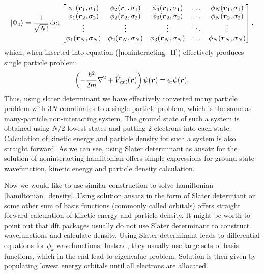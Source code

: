 \documentclass[openany, longbibliography,slovene,a4paper,12pt]{article}
\def\vec#1{\mbox{\boldmath$#1$}}
\begin{document}
 \[
       \ket{\Phi_0} = \frac{1}{\sqrt{N!}}\det 
   \begin{bmatrix}
   \phi_{1}(\vec r_1, \sigma_1) & \phi_{2}(\vec r_1, \sigma_1) & \phi_{3}(\vec
   r_1, \sigma_1) & \dots & \phi_{N}(\vec r_1, \sigma_1) \\
    \phi_{1}(\vec r_2, \sigma_2) & \phi_{2}(\vec r_2, \sigma_2) & \phi_{3}(\vec
    r_2, \sigma_2) & \dots & \phi_{N}(\vec r_2, \sigma_2) \\
    \vdots & \vdots & \vdots & \ddots & \vdots \\
     \phi_{1}(\vec r_N, \sigma_N) & \phi_{2}(\vec r_N, \sigma_N) & \phi_{3}(\vec r_N, \sigma_N) & \dots & \phi_{N}(\vec r_N, \sigma_N) \\
\end{bmatrix},
\]
 which, when inserted into equation (\ref{noninteracting_H}) effectively produces
 single particle problem:
 \begin{equation}
   \left(-\frac{\hbar^2}{2m}\nabla^2 + \hat V_{ext}(\vec r)\right) \psi (\vec r) = \epsilon_i \psi(\vec r).
 \end{equation}
 Thus, using slater determinant we have effectively converted many particle
 problem with $3N$ coordinates to a single particle problem, which is the same as many-particle
 non-interacting system.
 The ground state of such a system is obtained using $N/2$ lowest states and
 putting 2 electrons into each state. Calculation of kinetic energy and particle
 density for such a system is also straight forward. As we can see, using Slater
 determinant as ansatz for the solution of noninteracting hamiltonian offers
 simple expressions for ground state wavefunction, kinetic energy and particle density
 calculation.  

Now we would like to use similar construction to solve hamiltonian
\ref{hamiltonian_density}. Using solution ansatz in the form of Slater
determiant or some other sum of basis functions (commonly called orbitals) offers straight forward
calculation of kinetic energy and  particle density. It might be worth to point
out that dft packages usually do not use Slater determinant to construct
wavefunctions and calculate density. Using Slater determinant leads to
differential equations for $\phi_k$ wavefunctions. Instead, they usually use
large sets of basis functions, which in the end lead to eigenvalue problem.
Solution is then given by populating lowest energy orbitals until all electrons
are allocated. 
 
\end{document}
